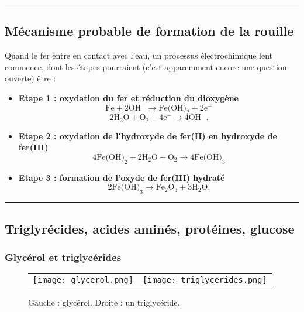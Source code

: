 \documentclass{article}
\begin{document}
\rule{\linewidth}{0.2mm}

\subsection*{Mécanisme probable de formation de la rouille}

Quand le fer entre en contact avec l'eau, un processus électrochimique lent commence, dont les étapes pourraient (c'est apparemment encore une question ouverte) être :\\
\begin{itemize}
	\item \textbf{Etape 1 : oxydation du fer et réduction du dioxygène}
	\begin{equation}
		\text{Fe} + 2\text{OH}^- \rightarrow \text{Fe(OH)}_2 + 2\text{e}^-
	\end{equation}
	\begin{equation}
		2\text{H}_2\text{O} + \text{O}_2 + 4 \text{e}^- \rightarrow 4\text{OH}^-. 
	\end{equation}
	
	\item \textbf{Etape 2 : oxydation de l'hydroxyde de fer(II) en hydroxyde de fer(III)}
	\begin{equation}
		4\text{Fe(OH)}_2 + 2\text{H}_2\text{O} + \text{O}_2\rightarrow 4\text{Fe(OH)}_3 
	\end{equation}	 
	\item \textbf{Etape 3 : formation de l'oxyde de fer(III) hydraté}
	\begin{equation}
		2\text{Fe(OH)}_3 \rightarrow \text{Fe}_2\text{O}_3 + 3\text{H}_2\text{O}.
	\end{equation}
\end{itemize}

\rule{\linewidth}{0.2mm}

\subsection*{Triglyrécides, acides aminés, protéines, glucose}

\subsubsection*{Glycérol et triglycérides}
\begin{figure}[h!]
	\begin{center}
		\begin{tabular}{cc}
  		\texttt{[image: glycerol.png]} &
   		\texttt{[image: triglycerides.png]}\\
	\end{tabular}
	\caption{Gauche : glycérol. Droite : un triglycéride.}
	\end{center}
\end{figure}
\end{document}
